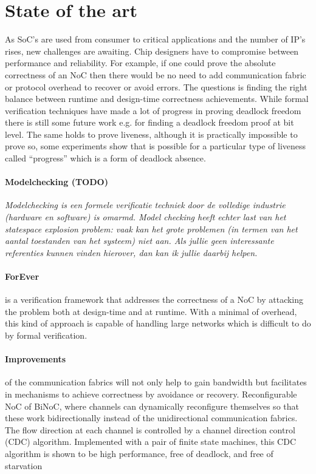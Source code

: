 \section{State of the art}

As SoC's are used from consumer to critical applications and the number of IP's
rises, new challenges are awaiting. Chip designers have to compromise between
performance and reliability. For example, if one could prove the absolute
correctness of an NoC then there would be no need to add communication fabric or
protocol overhead to recover or avoid errors. The questions is finding the right
balance between runtime and design-time correctness achievements. While formal
verification techniques have made a lot of progress in proving deadlock freedom
there is still some future work e.g. for finding a deadlock freedom proof at bit
level. The same holds to prove liveness, although it is practically impossible to
prove so, some experiments show that is possible for a particular type of
liveness called ``progress'' which is a form of deadlock absence.
\cite{Ray:2012:SPV:2492708.2492936,itp}


\paragraph{Modelchecking (TODO)}
\textit{Modelchecking is een formele verificatie techniek door de volledige industrie
(hardware en software) is omarmd. Model checking heeft echter last van het
statespace explosion problem: vaak kan het grote problemen (in termen van het
aantal toestanden van het systeem) niet aan. Als jullie geen interessante
referenties kunnen vinden hierover, dan kan ik jullie daarbij helpen.}


\paragraph{ForEver}is a verification framework that addresses the correctness
of a NoC by attacking the problem both at design-time and at runtime. With a
minimal of overhead, this kind of approach is capable of handling large networks
which is difficult to do by formal verification.
\cite{Parikh:2014:FCF:2597868.2514871}

\paragraph{Improvements}of the communication fabrics will not only help to
gain bandwidth but facilitates in mechanisms to achieve correctness by avoidance
or recovery. Reconfigurable NoC of BiNoC, where channels can dynamically
reconfigure themselves so that these work bidirectionally instead of the
unidirectional communication fabrics. The flow direction at each channel is
controlled by a channel direction control (CDC) algorithm. Implemented with a
pair of finite state machines, this CDC algorithm is shown to be high
performance, free of deadlock, and free of starvation \cite{5715603}

